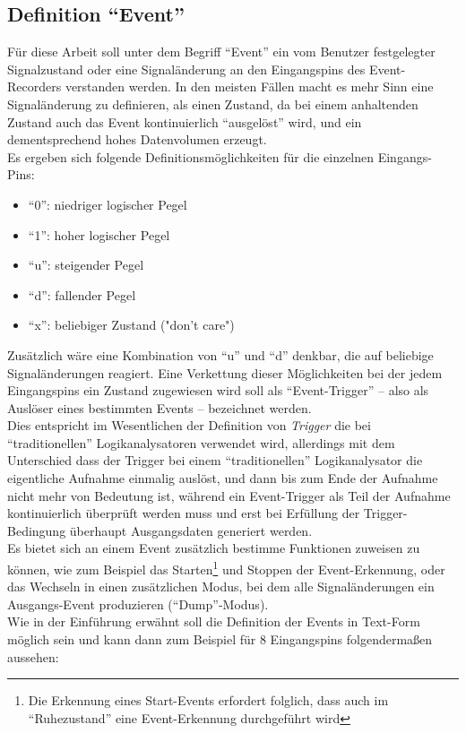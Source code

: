\subsection{Definition ``Event''}

Für diese Arbeit soll unter dem Begriff ``Event'' ein vom Benutzer festgelegter Signalzustand oder eine Signaländerung an den Eingangspins des Event-Recorders verstanden werden. In den meisten Fällen macht es mehr Sinn eine Signaländerung zu definieren, als einen Zustand, da bei einem anhaltenden Zustand auch das Event kontinuierlich ``ausgelöst'' wird, und ein dementsprechend hohes Datenvolumen erzeugt.\\
Es ergeben sich folgende Definitionsmöglichkeiten für die einzelnen Eingangs-Pins:
\begin{itemize}
	\item ``0'': niedriger logischer Pegel
	\item ``1'': hoher logischer Pegel
	\item ``u'': steigender Pegel
	\item ``d'': fallender Pegel
	\item ``x'': beliebiger Zustand ("don't care") 
\end{itemize}
Zusätzlich wäre eine Kombination von ``u'' und ``d'' denkbar, die auf beliebige Signaländerungen reagiert.
Eine Verkettung dieser Möglichkeiten bei der jedem Eingangspins ein Zustand zugewiesen wird soll als ``Event-Trigger'' -- also als Auslöser eines bestimmten Events -- bezeichnet werden.\\
Dies entspricht im Wesentlichen der Definition von \textit{Trigger} die bei ``traditionellen'' Logikanalysatoren verwendet wird, allerdings mit dem Unterschied dass der Trigger bei einem ``traditionellen'' Logikanalysator die eigentliche Aufnahme einmalig auslöst, und dann bis zum Ende der Aufnahme nicht mehr von Bedeutung ist, während ein Event-Trigger als Teil der Aufnahme kontinuierlich überprüft werden muss und erst bei Erfüllung der Trigger-Bedingung überhaupt Ausgangsdaten generiert werden.\\
Es bietet sich an einem Event zusätzlich bestimme Funktionen zuweisen zu können, wie zum Beispiel das Starten\footnote{Die Erkennung eines Start-Events erfordert folglich, dass auch im ``Ruhezustand'' eine Event-Erkennung durchgeführt wird} und Stoppen der Event-Erkennung, oder das Wechseln in einen zusätzlichen Modus, bei dem alle Signaländerungen ein Ausgangs-Event produzieren (``Dump''-Modus).\\
Wie in der Einführung erwähnt soll die Definition der Events in Text-Form möglich sein und kann dann zum Beispiel für 8 Eingangspins folgendermaßen aussehen:

